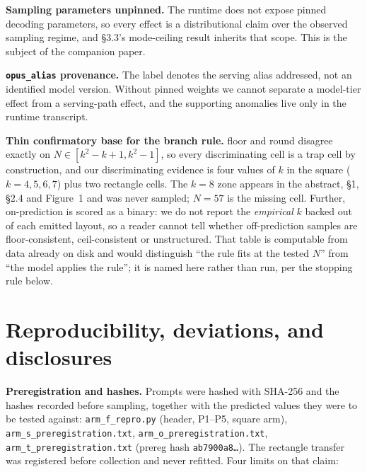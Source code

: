 \documentclass[11pt]{article}
\begin{document}
\textbf{Sampling parameters unpinned.} The runtime does not expose pinned decoding parameters, so
every effect is a distributional claim over the observed sampling regime, and \S3.3's
mode-ceiling result inherits that scope. This is the subject of the companion paper.

\textbf{\texttt{opus\_alias} provenance.} The label denotes the serving alias addressed, not an identified
model version. Without pinned weights we cannot separate a model-tier effect from a serving-path
effect, and the supporting anomalies live only in the runtime transcript.

\textbf{Thin confirmatory base for the branch rule.} floor and round disagree exactly on
$N \in [k^2-k+1, k^2-1]$, so every discriminating cell is a trap cell by construction, and our
discriminating evidence is four values of $k$ in the square ($k = 4, 5, 6, 7$) plus two rectangle
cells. The $k = 8$ zone appears in the abstract, \S1, \S2.4 and Figure~1 and was never sampled;
$N = 57$ is the missing cell. Further, on-prediction is scored as a binary: we do not report the
\textit{empirical} $k$ backed out of each emitted layout, so a reader cannot tell whether off-prediction
samples are floor-consistent, ceil-consistent or unstructured. That table is computable from
data already on disk and would distinguish ``the rule fits at the tested $N$'' from ``the model
applies the rule''; it is named here rather than run, per the stopping rule below.

\section{Reproducibility, deviations, and disclosures}

\textbf{Preregistration and hashes.} Prompts were hashed with SHA-256 and the hashes recorded before
sampling, together with the predicted values they were to be tested against: \texttt{arm\_f\_repro.py}
(header, P1--P5, square arm), \texttt{arm\_s\_preregistration.txt}, \texttt{arm\_o\_preregistration.txt},
\texttt{arm\_t\_preregistration.txt} (prereg hash \texttt{ab7900a8\dots}). The rectangle transfer was registered
before collection and never refitted. Four limits on that claim:
\end{document}

